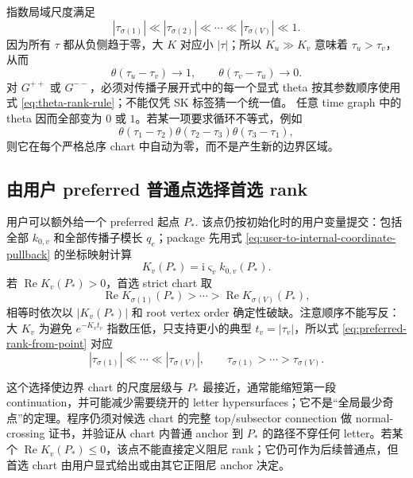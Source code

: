\documentclass[11pt,a4paper]{ctexart}
\newcommand{\ii}{\mathrm i}
\begin{document}
指数局域尺度满足
\begin{equation}
 |\tau_{\sigma(1)}|\ll|\tau_{\sigma(2)}|\ll\cdots
 \ll|\tau_{\sigma(V)}|\ll1.
 \label{eq:tau-rank}
\end{equation}
因为所有 $\tau$ 都从负侧趋于零，大 $K$ 对应小 $|\tau|$；所以 $K_u\gg K_v$ 意味着 $\tau_u>\tau_v$，从而
\begin{equation}
 \theta(\tau_u-\tau_v)\longrightarrow1,
 \qquad
 \theta(\tau_v-\tau_u)\longrightarrow0.
 \label{eq:theta-rank-rule}
\end{equation}
对 $G^{++}$ 或 $G^{--}$，必须对传播子展开式中的每一个显式 theta 按其参数顺序使用式 \eqref{eq:theta-rank-rule}；不能仅凭 SK 标签猜一个统一值。
任意 time graph 中的 theta 因而全部变为 $0$ 或 $1$。若某一项要求循环不等式，例如
\begin{equation}
 \theta(\tau_1-\tau_2)\theta(\tau_2-\tau_3)
 \theta(\tau_3-\tau_1),
\end{equation}
则它在每个严格总序 chart 中自动为零，而不是产生新的边界区域。

\subsection{由用户 preferred 普通点选择首选 rank}

用户可以额外给一个 preferred 起点 $P_*$. 该点仍按初始化时的用户变量提交：包括全部 $k_{0,v}$ 和全部传播子模长 $q_e$；package 先用式 \eqref{eq:user-to-internal-coordinate-pullback} 的坐标映射计算
\begin{equation}
 K_v(P_*)=\ii\varsigma_vk_{0,v}(P_*).
\end{equation}
若 $\operatorname{Re}K_v(P_*)>0$，首选 strict chart 取
\begin{equation}
 \operatorname{Re}K_{\sigma(1)}(P_*)>\cdots>
 \operatorname{Re}K_{\sigma(V)}(P_*),
 \label{eq:preferred-rank-from-point}
\end{equation}
相等时依次以 $|K_v(P_*)|$ 和 root vertex order 确定性破缺。注意顺序不能写反：大 $K_v$ 为避免 $e^{-K_vt_v}$ 指数压低，只支持更小的典型 $t_v=|\tau_v|$，所以式 \eqref{eq:preferred-rank-from-point} 对应
\begin{equation}
 |\tau_{\sigma(1)}|\ll\cdots\ll|\tau_{\sigma(V)}|,
 \qquad
 \tau_{\sigma(1)}>\cdots>\tau_{\sigma(V)}.
\end{equation}

这个选择使边界 chart 的尺度层级与 $P_*$ 最接近，通常能缩短第一段 continuation，并可能减少需要绕开的 letter hypersurfaces；它不是“全局最少奇点”的定理。程序仍须对候选 chart 的完整 top/subsector connection 做 normal-crossing 证书，并验证从 chart 内普通 anchor 到 $P_*$ 的路径不穿任何 letter。若某个 $\operatorname{Re}K_v(P_*)\leq0$，该点不能直接定义阻尼 rank；它仍可作为后续普通点，但首选 chart 由用户显式给出或由其它正阻尼 anchor 决定。
\end{document}
